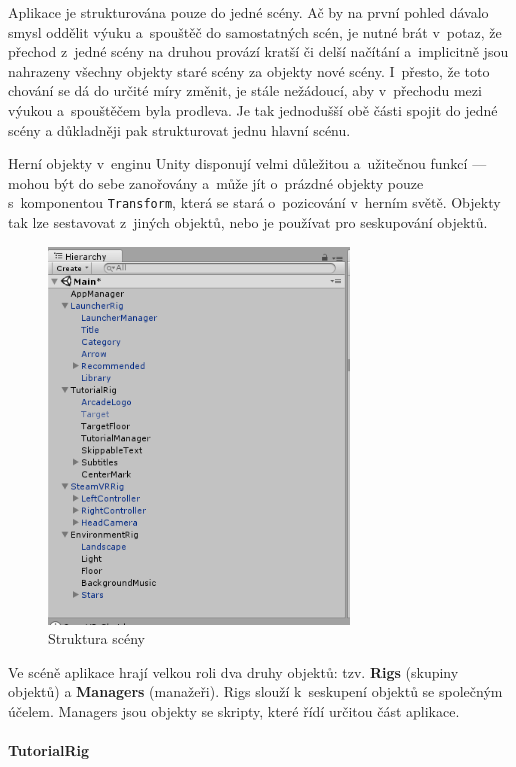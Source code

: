 Aplikace je strukturována pouze do jedné scény. Ač by na první pohled
dávalo smysl oddělit výuku a~spouštěč do samostatných scén, je nutné
brát v~potaz, že přechod z~jedné scény na druhou provází kratší či delší
načítání a~implicitně jsou nahrazeny všechny objekty staré scény za
objekty nové scény. I~přesto, že toto chování se dá do určité míry
změnit, je stále nežádoucí, aby v~přechodu mezi výukou a~spouštěčem
byla prodleva. Je tak jednodušší obě části spojit do jedné scény a
důkladněji pak strukturovat jednu hlavní scénu.

Herní objekty v~enginu Unity disponují velmi důležitou a~užitečnou
funkcí --- mohou být do sebe zanořovány a~může jít o~prázdné objekty
pouze s~komponentou \texttt{Transform}, která se stará o~pozicování
v~herním světě. Objekty tak lze sestavovat z~jiných objektů, nebo je
používat pro seskupování objektů.

\newpage

\begin{figure}[h!]
\centering
\includegraphics[height=10cm]{src/assets/structure.png}
\caption{Struktura scény}
\end{figure}

Ve scéně aplikace hrají velkou roli dva druhy objektů: tzv.
\textbf{Rigs} (skupiny objektů) a \textbf{Managers} (manažeři). Rigs
slouží k~seskupení objektů se společným účelem. Managers jsou 
objekty se skripty, které řídí určitou část aplikace.

\paragraph{TutorialRig}\label{tutorialrig}


